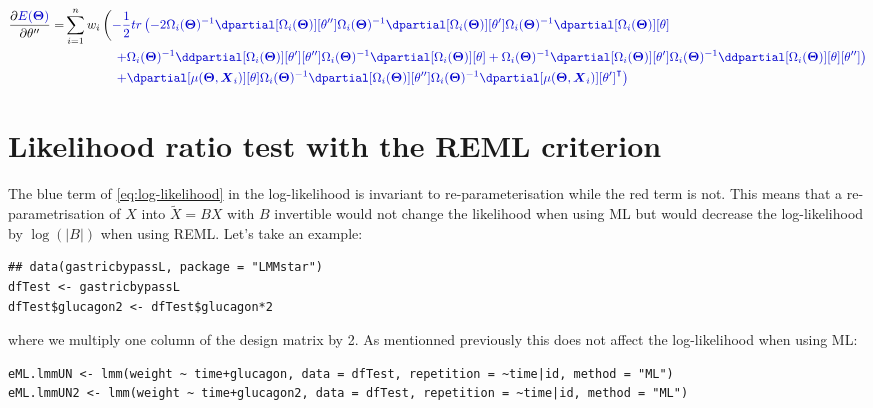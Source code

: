 \documentclass[12pt]{article}
\newcommand{\darkblue}{blue!80!black}
\newcommand\trans[1]{{#1}^\intercal}%
\newcommand{\param}{\Theta}
\newcommand{\Vparam}{\boldsymbol{\param}}
\newcommand{\VX}{\boldsymbol{X}}
\begin{document}
\begin{align*}
 \frac{\partial\textcolor{\darkblue}{E(\Vparam)}}{\partial \theta^{\prime\prime}}=&
 \sum_{i=1}^n w_i \left( \textcolor{\darkblue}{
- \frac{1}{2} tr\left(
-2\Omega_i(\Vparam)^{-1} \dpartial[\Omega_i(\Vparam)][\theta^{\prime\prime}] \Omega_i(\Vparam)^{-1} \dpartial[\Omega_i(\Vparam)][\theta^{\prime}] \Omega_i(\Vparam)^{-1} \dpartial[\Omega_i(\Vparam)][\theta] \right. } \right. \\
& \qquad \qquad \textcolor{\darkblue}{\left. + \Omega_i(\Vparam)^{-1} \ddpartial[\Omega_i(\Vparam)][\theta^{\prime}][\theta^{\prime\prime}] \Omega_i(\Vparam)^{-1} \dpartial[\Omega_i(\Vparam)][\theta]
+ \Omega_i(\Vparam)^{-1} \dpartial[\Omega_i(\Vparam)][\theta^{\prime}] \Omega_i(\Vparam)^{-1} \ddpartial[\Omega_i(\Vparam)][\theta][\theta^{\prime\prime}]
\right)} \\
& \qquad \qquad  \textcolor{\darkblue}{\left. + \dpartial[\mu(\Vparam,\VX_i)][\theta] \Omega_i(\Vparam)^{-1} \dpartial[\Omega_i(\Vparam)][\theta^{\prime\prime}] \Omega_i(\Vparam)^{-1}   \trans{\dpartial[\mu(\Vparam,\VX_i)][\theta^{\prime}]}
 \right)}
\end{align*}





\clearpage

\section{Likelihood ratio test with the REML criterion}
\label{SM:LRT-REML}
The blue term of \autoref{eq:log-likelihood} in the log-likelihood is
invariant to re-parameterisation while the red term is not. This means
that a re-parametrisation of \(X\) into \(\tilde{X} = B X\) with \(B\)
invertible would not change the likelihood when using ML but would
decrease the log-likelihood by \(\log(|B|)\) when using REML. \newline
Let's take an example:
\lstset{language=r,label= ,caption= ,captionpos=b,numbers=none}
\begin{lstlisting}
## data(gastricbypassL, package = "LMMstar")
dfTest <- gastricbypassL
dfTest$glucagon2 <- dfTest$glucagon*2
\end{lstlisting}

where we multiply one column of the design matrix by 2. As mentionned
previously this does not affect the log-likelihood when using ML:
\lstset{language=r,label= ,caption= ,captionpos=b,numbers=none}
\begin{lstlisting}
eML.lmmUN <- lmm(weight ~ time+glucagon, data = dfTest, repetition = ~time|id, method = "ML")
eML.lmmUN2 <- lmm(weight ~ time+glucagon2, data = dfTest, repetition = ~time|id, method = "ML")
\end{lstlisting}
\end{document}

